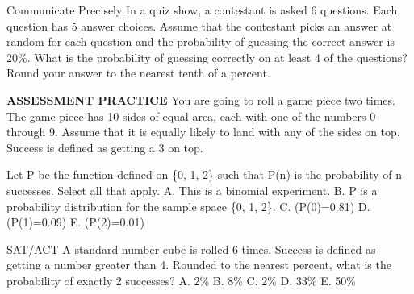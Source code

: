 \documentclass{article}
\newenvironment{practice}[2]{}{}        %
\newcommand{\answer}[1]{}               %
\newcommand{\placeholder}[2]{}          %
\newcommand{\te}[1]{}                   %
\begin{document}
\begin{practice}{29}{2}
Communicate Precisely In a quiz show, a contestant is asked 6 questions. Each question has 5 answer choices. Assume that the contestant picks an answer at random for each question and the probability of guessing the correct answer is 20\%. What is the probability of guessing correctly on at least 4 of the questions? Round your answer to the nearest tenth of a percent.
\answer{1.7\%}
\end{practice}
\begin{practice}{30}{1}
\textbf{ASSESSMENT PRACTICE}
You are going to roll a game piece two times. The game piece has 10 sides of equal area, each with one of the numbers 0 through 9. Assume that it is equally likely to land with any of the sides on top. Success is defined as getting a 3 on top.
\placeholder{illustration}{Red ten-sided game piece with white digits, visible faces 0 front upper, 4 upper right, 8 upper left, 3 lower left, 7 lower right.}
Let P be the function defined on \{0, 1, 2\} such that P(n) is the probability of n successes. Select all that apply.
A. This is a binomial experiment.
B. P is a probability distribution for the sample space \{0, 1, 2\}.
C. (P(0)=0.81)
D. (P(1)=0.09)
E. (P(2)=0.01)
\answer{A, B, C, E}
\end{practice}
\begin{practice}{31}{1}
SAT/ACT A standard number cube is rolled 6 times. Success is defined as getting a number greater than 4. Rounded to the nearest percent, what is the probability of exactly 2 successes?
A. 2\%
B. 8\%
C. 2\%
D. 33\%
E. 50\%
\answer{D}
\te{Printed A and C both 2 percent.}
\end{practice}
\end{document}
